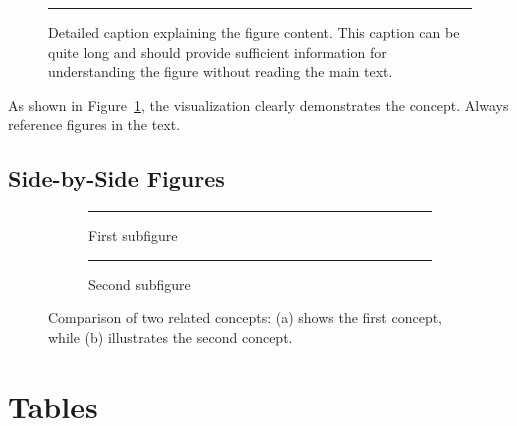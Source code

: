 \begin{figure}[htbp]
	\centering
	\rule{0.6\textwidth}{0.4\textwidth} %
	\caption[Short caption for list of figures]{Detailed caption explaining the
		figure content. This caption can be quite long and should provide
		sufficient information for understanding the figure without reading
		the main text.}
	\label{fig:single_example}
\end{figure}

As shown in Figure~\ref{fig:single_example}, the visualization clearly
demonstrates the concept. Always reference figures in the text.

\subsection{Side-by-Side Figures}
\label{subsec:multiple_figures}

\begin{figure}[htbp]
	\centering
	\begin{subfigure}[b]{0.45\textwidth}
		\centering
		\rule{\textwidth}{0.6\textwidth} %
		\caption{First subfigure}
		\label{fig:sub1}
	\end{subfigure}
	\hfill
	\begin{subfigure}[b]{0.45\textwidth}
		\centering
		\rule{\textwidth}{0.6\textwidth} %
		\caption{Second subfigure}
		\label{fig:sub2}
	\end{subfigure}
	\caption{Comparison of two related concepts: (a) shows the first concept,
		while (b) illustrates the second concept.}
	\label{fig:comparison}
\end{figure}

\section{Tables}
\label{sec:tables}


